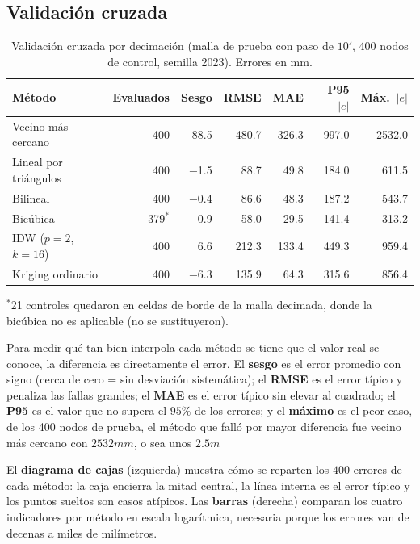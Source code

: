 \documentclass[11pt,letterpaper]{article}
\begin{document}
\subsection{Validación cruzada}
\begin{table}[H]
\centering
\caption{Validación cruzada por decimación (malla de prueba con paso de $10'$, 400 nodos
de control, semilla 2023). Errores en mm.}
\label{tab:cv}
\begin{tabular}{@{}lrrrrrr@{}}
\toprule
Método & Evaluados & Sesgo & RMSE & MAE & P95 $|e|$ & Máx.\ $|e|$ \\
\midrule
Vecino más cercano & 400 & \num{88.5} & \num{480.7} & \num{326.3} & \num{997.0} & \num{2532.0} \\
Lineal por triángulos & 400 & \num{-1.5} & \num{88.7} & \num{49.8} & \num{184.0} & \num{611.5} \\
Bilineal & 400 & \num{-0.4} & \num{86.6} & \num{48.3} & \num{187.2} & \num{543.7} \\
Bicúbica & 379$^{*}$ & \num{-0.9} & \num{58.0} & \num{29.5} & \num{141.4} & \num{313.2} \\
IDW ($p=2$, $k=16$) & 400 & \num{6.6} & \num{212.3} & \num{133.4} & \num{449.3} & \num{959.4} \\
Kriging ordinario & 400 & \num{-6.3} & \num{135.9} & \num{64.3} & \num{315.6} & \num{856.4} \\
\bottomrule
\end{tabular}

\vspace{0.1cm}
\footnotesize $^{*}$21 controles quedaron en celdas de borde de la malla decimada, donde la
bicúbica no es aplicable (no se sustituyeron).
\end{table}

Para medir qué tan bien interpola cada método se tiene que el valor real se conoce,
la diferencia es directamente el error. El \textbf{sesgo}
es el error promedio con signo (cerca de cero = sin desviación sistemática); el
\textbf{RMSE} es el error típico y penaliza las fallas grandes; el \textbf{MAE}
es el error típico sin elevar al cuadrado; el \textbf{P95} es el valor que no
supera el $95\%$ de los errores; y el \textbf{máximo} es el peor caso, de los 400 nodos de prueba, el método que falló por mayor diferencia fue vecino más cercano con $2532 mm$, o sea unos $2.5m$

\vspace{0.4cm}
El \textbf{diagrama de cajas} (izquierda) muestra cómo se reparten los $400$
errores de cada método: la caja encierra la mitad central, la línea interna es
el error típico y los puntos sueltos son casos atípicos. Las \textbf{barras}
(derecha) comparan los cuatro indicadores por método en escala logarítmica,
necesaria porque los errores van de decenas a miles de milímetros.
\end{document}
